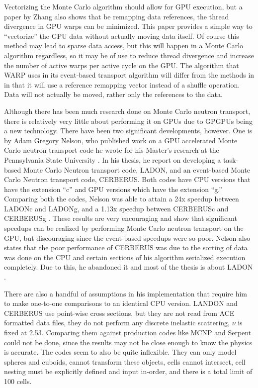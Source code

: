 Vectorizing the Monte Carlo algorithm should allow for GPU execution, but a paper by Zhang \cite{on_the_fly_remapping} also shows that be remapping data references, the thread divergence in GPU warps can be minimized.  This paper provides a simple way to ``vectorize'' the GPU data without actually moving data itself.  Of course this method may lead to sparse data access, but this will happen in a Monte Carlo algorithm regardless, so it may be of use to reduce thread divergence and increase the number of active warps per active cycle on the GPU.  The algorithm that WARP uses in its event-based transport algorithm will differ from the methods in \cite{vector,vujic_vector} in that it will use a reference remapping vector instead of a shuffle operation.  Data will not actually be moved, rather only the references to the data. 

Although there has been much research done on Monte Carlo neutron transport, there is relatively very little about performing it on GPUs due to GPGPUs being a new technology.  There have been two significant developments, however.  One is by Adam Gregory Nelson, who published work on a GPU accelerated Monte Carlo neutron transport code he wrote for his Master's research at the Pennsylvania State University \cite{nelson}.  In his thesis, he report on developing a task-based Monte Carlo Neutron transport code, LADON, and an event-based Monte Carlo Neutron transport code, CERBERUS.  Both codes have CPU versions that have the extension ``c'' and GPU versions which have the extension ``g.''  Comparing both the codes, Nelson was able to attain a 24x speedup between LADONc and LADONg, and a 1.13x speedup between CERBERUSc and CERBERUSg .  These results are very encouraging and show that significant speedups can be realized by performing Monte Carlo neutron transport on the GPU, but discouraging since the event-based speedups were so poor.  Nelson also states that the poor performance of CERBERUS was due to the sorting of data was done on the CPU and certain sections of his algorithm serialized execution completely.  Due to this, he abandoned it and most of the thesis is about LADON \cite{nelson}.  

There are also a handful of assumptions in his implementation that require him to make one-to-one comparisons to an identical CPU version.  LANDON and CERBERUS use point-wise cross sections, but they are not read from ACE formatted data files, they do not perform any discrete inelastic scattering,  $\nu$ is fixed at 2.53.  Comparing them against production codes like MCNP and Serpent could not be done, since the results may not be close enough to know the physics is accurate.  The codes seem to also be quite inflexible.  They can only model spheres and cuboids, cannot transform these objects, cells cannot intersect, cell nesting must be explicitly defined and input in-order, and there is a total limit of 100 cells.

